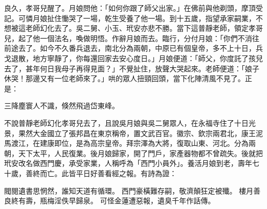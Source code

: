 良久，孝哥兒醒了。月娘問他：「如何你跟了師父出家。」在佛前與他剃頭，摩頂受記。可憐月娘扯住慟哭了一場，乾生受養了他一場。到十五歲，指望承家嗣業，不想被這老師幻化去了。吳二舅、小玉、玳安亦悲不勝。當下這普靜老師，領定孝哥兒，起了他一個法名，喚做明悟。作辭月娘而去。臨行，分付月娘：「你們不消往前途去了。如今不久番兵退去，南北分為兩朝，中原已有個皇帝，多不上十日，兵戈退散，地方寧靜了，你每還回家去安心度日。」月娘便道：「師父，你度託了孩兒去了，甚年何日我母子再得見面？」不覺扯住，放聲大哭起來。老師便道：「娘子休哭！那邊又有一位老師來了。」哄的眾人扭頸回頭，當下化陣清風不見了。正是：

三降塵寰人不識，倏然飛過岱東峰。

不說普靜老師幻化孝哥兒去了，且說吳月娘與吳二舅眾人，在永福寺住了十日光景，果然大金國立了張邦昌在東京稱帝，置文武百官。徽宗、欽宗兩君北，康王泥馬渡江，在建康即位，是為高宗皇帝。拜宗澤為大將，復取山東、河北。分為兩朝，天下太平，人民復業。後月娘歸家，開了門戶，家產器物都不曾疏失。後就把玳安改名做西門慶，承受家業，人稱呼為「西門小員外」。養活月娘到老，壽年七十歲，善終而亡。此皆平日好善看經之報。有詩為證：

閥閱遺書思惘然，誰知天道有循環。
西門豪橫難存嗣，敬濟顛狂定被殲。
樓月善良終有壽，瓶梅淫佚早歸泉。
可怪金蓮遭惡報，遺臭千年作話傳。

